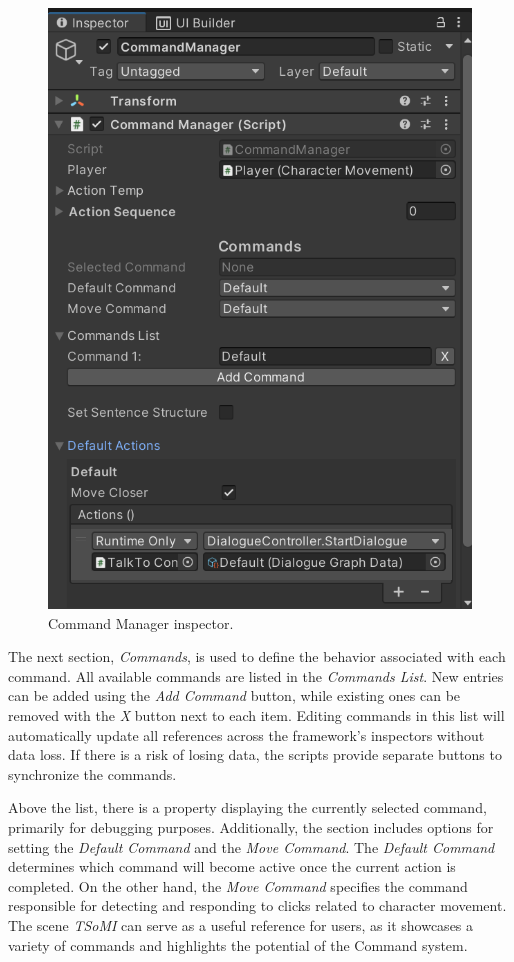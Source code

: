 \begin{figure}[H]
\centering
\includegraphics[width=.7\linewidth]{img/User doc/command_manager.png}
\caption{Command Manager inspector.}
\label{fig:Manual-CM}
\end{figure}

The next section, \textit{Commands}, is used to define the behavior associated with each command. All available commands are listed in the \textit{Commands List}. New entries can be added using the \textit{Add Command} button, while existing ones can be removed with the \textit{X} button next to each item. Editing commands in this list will automatically update all references across the framework’s inspectors without data loss. If there is a risk of losing data, the scripts provide separate buttons to synchronize the commands.

Above the list, there is a property displaying the currently selected command, primarily for debugging purposes. Additionally, the section includes options for setting the \textit{Default Command} and the \textit{Move Command}. The \textit{Default Command} determines which command will become active once the current action is completed. On the other hand, the \textit{Move Command} specifies the command responsible for detecting and responding to clicks related to character movement. The scene \textit{TSoMI} can serve as a useful reference for users, as it showcases a variety of commands and highlights the potential of the Command system.

